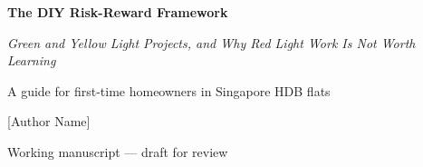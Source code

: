 \documentclass[11pt,openany]{book}
\begin{document}
\frontmatter

\begin{titlepage}
  \centering
  {\Huge\bfseries The DIY Risk-Reward Framework\par}
  \vspace{1.5em}
  {\Large\itshape Green and Yellow Light Projects, and Why Red Light Work Is Not Worth Learning\par}
  \vspace{2.5em}
  {\large A guide for first-time homeowners in Singapore HDB flats\par}
  \vfill
  {\large [Author Name]\par}
  \vspace{1.5em}
  {\small Working manuscript --- draft for review\par}
\end{titlepage}

\tableofcontents

\mainmatter

















\appendix









\end{document}
